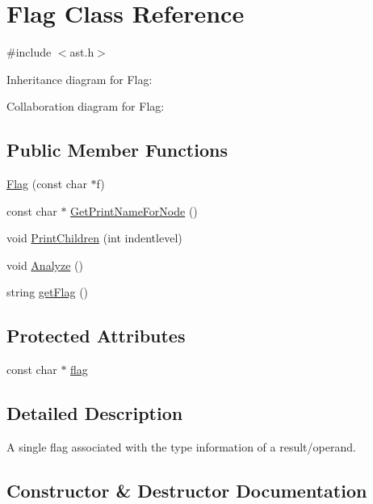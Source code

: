 \hypertarget{class_flag}{}\section{Flag Class Reference}
\label{class_flag}


{\ttfamily \#include $<$ast.\+h$>$}



Inheritance diagram for Flag\+:


Collaboration diagram for Flag\+:
\subsection*{Public Member Functions}
\begin{DoxyCompactItemize}
\item 
\hyperlink{class_flag_af71db868b7c54b0b7e33ea0a6e5060c9}{Flag} (const char $\ast$f)
\item 
const char $\ast$ \hyperlink{class_flag_a8d133ca3fbbef512357b5c80b0fe1222}{Get\+Print\+Name\+For\+Node} ()
\item 
void \hyperlink{class_flag_a05ac578c888a303d979d1d7b006ad7ba}{Print\+Children} (int indentlevel)
\item 
void \hyperlink{class_flag_ae09e99101902e5486e9d5712749623b3}{Analyze} ()
\item 
string \hyperlink{class_flag_a06f1c9c6b30ad492a14c8311c6276159}{get\+Flag} ()
\end{DoxyCompactItemize}
\subsection*{Protected Attributes}
\begin{DoxyCompactItemize}
\item 
const char $\ast$ \hyperlink{class_flag_a78bfa49c8908ef53f7d5b50be62ecbc9}{flag}
\end{DoxyCompactItemize}


\subsection{Detailed Description}
A single flag associated with the type information of a result/operand. 

\subsection{Constructor \& Destructor Documentation}
\mbox{\label{class_flag_af71db868b7c54b0b7e33ea0a6e5060c9}} 
